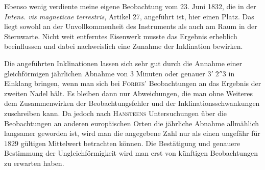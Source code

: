 Ebenso wenig verdiente meine eigene Beobachtung vom 23. Juni 1832, die in der \textit{Intens. vis magneticae terrestris}, Artikel 27, angeführt ist, hier einen Platz. Das liegt sowohl an der Unvollkommenheit des Instruments als auch am Raum in der Sternwarte. Nicht weit entferntes Eisenwerk musste das Ergebnis erheblich beeinflussen und dabei nachweislich eine Zunahme der Inklination bewirken.

Die angeführten Inklinationen lassen sich sehr gut durch die Annahme einer gleichförmigen jährlichen Abnahme von $3$ Minuten oder genauer $3'\;2''3$ in Einklang bringen, wenn man sich bei \textsc{Forbes}' Beobachtungen an das Ergebnis der zweiten Nadel hält. Es bleiben dann nur Abweichungen, die man ohne Weiteres dem Zusammenwirken der Beobachtungsfehler und der Inklinationsschwankungen zuschreiben kann. Da jedoch nach \textsc{Hansteens} Untersuchungen über die Beobachtungen an anderen europäischen Orten die jährliche Abnahme allmählich langsamer geworden ist, wird man die angegebene Zahl nur als einen ungefähr für $1829$ gültigen Mittelwert betrachten können. Die Bestätigung und genauere Bestimmung der Ungleichförmigkeit wird man erst von künftigen Beobachtungen zu erwarten haben.


\par\endgroup

